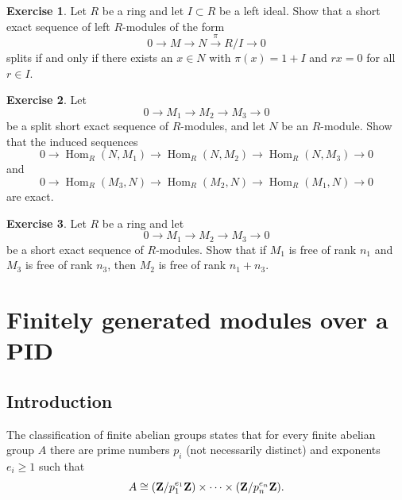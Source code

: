 \documentclass[11pt]{amsbook}
\newcommand{\longto}{\longrightarrow}
\DeclareMathOperator\Hom{Hom}
\theoremstyle{plain}
\theoremstyle{definition}
\newtheorem{exercise}{Exercise}
\begin{document}
\begin{exercise}
Let $R$ be a ring and let $I\subset R$ be a left ideal. Show that a short exact sequence
of left $R$-modules of the form
\[
	0 \longto M \longto N \overset{\pi}{\longto} R/I \longto 0
\]
splits if and only if there exists an $x\in N$ with $\pi(x)=1+I$ and $rx=0$ for all $r\in I$.
\end{exercise}



\begin{exercise}\label{exc:hom-of-split-exact-seq}
Let
\[
	0\longto M_1 \longto M_2 \longto M_3 \longto 0
\]
be a split short exact sequence of $R$-modules, and let $N$ be an $R$-module. Show that the induced sequences
\[
	0 \longto \Hom_R(N,M_1) \longto \Hom_R(N,M_2) \longto \Hom_R(N,M_3) \longto 0
\]
and
\[
	0 \longto \Hom_R(M_3,N) \longto \Hom_R(M_2,N) \longto \Hom_R(M_1,N) \longto 0
\]
are exact.
\end{exercise}


\begin{exercise}
Let $R$ be a ring and let 
\[
	0 \longto M_1 \longto M_2 \longto M_3 \longto 0
\]
be a short exact sequence of $R$-modules. Show that if $M_1$ is free of rank $n_1$ and $M_3$ is free of rank $n_3$, then $M_2$ is free of rank $n_1+n_3$.
\end{exercise}
%
%



\chapter{Finitely generated modules over a PID}\label{ch:modules-over-PID}

\section{Introduction}



The classification of finite abelian groups states that for every finite abelian group $A$ there are prime numbers $p_i$ (not necessarily distinct) and exponents $e_i\geq 1$ such that
\[
	A \cong ({\mathbf{Z}}/p_1^{e_1}{\mathbf{Z}}) \times \cdots \times ({\mathbf{Z}}/p_n^{e_n}{\mathbf{Z}}).
 \]
 
\end{document}
